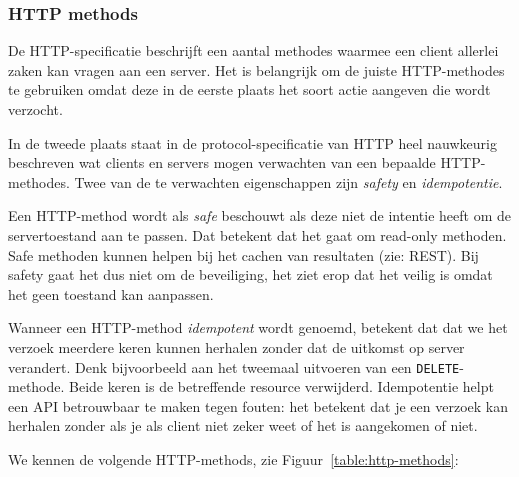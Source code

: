 \subsubsection{HTTP methods}
De HTTP-specificatie beschrijft een aantal methodes 
waarmee een client allerlei zaken kan vragen aan een server.
Het is belangrijk om de juiste HTTP-methodes te gebruiken omdat 
deze in de eerste plaats het soort actie aangeven die wordt verzocht.

In de tweede plaats staat in de protocol-specificatie van HTTP heel 
nauwkeurig beschreven wat clients en servers mogen verwachten van een 
bepaalde HTTP-methodes. 
Twee van de te verwachten eigenschappen zijn \textit{safety}
en \textit{idempotentie}.

Een HTTP-method wordt als \textit{safe} beschouwt als deze niet 
de intentie heeft om de servertoestand aan te passen. 
Dat betekent dat het gaat om read-only methoden. Safe 
methoden kunnen helpen bij het cachen van resultaten (zie: REST).
Bij safety gaat het dus niet om de beveiliging, het ziet 
erop dat het veilig is omdat het geen toestand kan aanpassen.

Wanneer een HTTP-method \textit{idempotent} wordt genoemd,
betekent dat dat we het verzoek meerdere keren kunnen herhalen
zonder dat de uitkomst op server verandert. Denk bijvoorbeeld aan 
het tweemaal uitvoeren van een \texttt{DELETE}-methode. Beide keren is 
de betreffende resource verwijderd. Idempotentie helpt een API betrouwbaar 
te maken tegen fouten: het betekent dat je een verzoek kan herhalen zonder 
als je als client niet zeker weet of het is aangekomen of niet.

We kennen de volgende HTTP-methods, zie Figuur~\ref{table:http-methods}:

